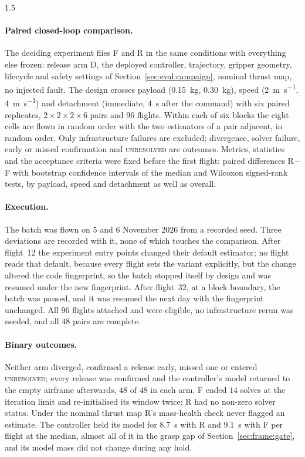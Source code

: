\begin{spacing}{1.5}
\paragraph{Paired closed-loop comparison.} The deciding experiment flies F and R
in the same conditions with everything else frozen: release arm D, the
deployed controller, trajectory, gripper geometry, lifecycle and safety settings
of Section~\ref{sec:eval:campaign}, nominal thrust map, no injected fault. The
design crosses payload (\SI{0.15}{\kg}, \SI{0.30}{\kg}), speed
(\SI{2}{\meter\per\second}, \SI{4}{\meter\per\second}) and detachment (immediate,
\SI{4}{\second} after the command) with six paired replicates, $2\times2\times2\times6$
pairs and 96 flights. Within each of six blocks the eight cells are flown in
random order with the two estimators of a pair adjacent, in random order. Only
infrastructure failures are excluded; divergence, solver failure, early or
missed confirmation and \textsc{unresolved} are outcomes. Metrics, statistics
and the acceptance criteria were fixed before the first flight: paired
differences R$-$F with bootstrap confidence intervals of the median and Wilcoxon
signed-rank tests, by payload, speed and detachment as well as overall.

\paragraph{Execution.} The batch was flown on 5 and 6 November 2026 from a
recorded seed. Three deviations are recorded with it, none of which touches the
comparison. After flight~12 the experiment entry points changed their default
estimator; no flight reads that default, because every flight sets the variant
explicitly, but the change altered the code fingerprint, so the batch stopped
itself by design and was resumed under the new fingerprint. After flight~32, at a
block boundary, the batch was paused, and it was resumed the next day with the
fingerprint unchanged. All $96$ flights attached and were eligible, no
infrastructure rerun was needed, and all $48$ pairs are complete.

\paragraph{Binary outcomes.} Neither arm diverged, confirmed a release early,
missed one or entered \textsc{unresolved}; every release was confirmed and the
controller's model returned to the empty airframe afterwards, $48$ of $48$ in each
arm. F ended $14$ solves at the iteration limit and re-initialised its window
twice; R had no non-zero solver status. Under the nominal thrust map R's
mass-health check never flagged an estimate. The controller held its model for
\SI{8.7}{\second} with R and \SI{9.1}{\second} with F per flight at the median,
almost all of it in the grasp gap of Section~\ref{sec:frame:gate}, and its model
mass did not change during any hold.


\end{spacing}
